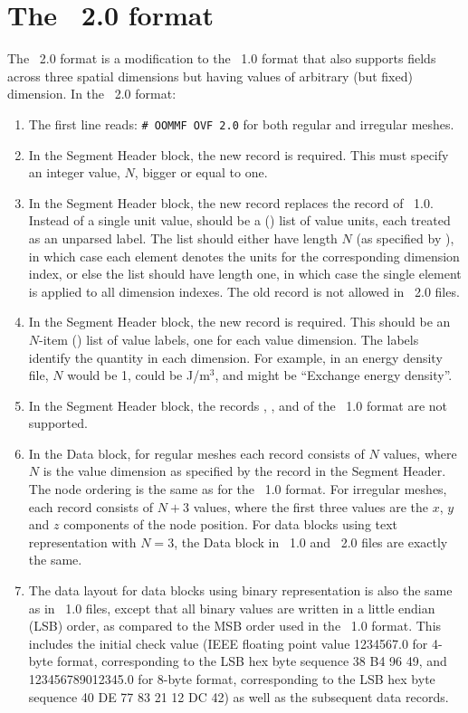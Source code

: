 \section{The \OVF\ 2.0 format}\label{sec:ovf20format}
The \OVF~2.0 format is a modification to the \OVF~1.0 format that also
supports fields across three spatial dimensions but having values of
arbitrary (but fixed) dimension.  In the \OVF~2.0 format:
\begin{enumerate}
\item The first line reads: \verb+# OOMMF OVF 2.0+ for both
regular and irregular meshes.
\item In the Segment Header block, the new record  is
required.  This must specify an integer value, $N$, bigger or equal to
one.
\item In the Segment Header block, the new  record
replaces the  record of \OVF~1.0.  Instead of a single
unit value,  should be a (\Tcl) list of value units, each
treated as an unparsed label.  The list should either have length $N$
(as specified by ), in which case each element denotes
the units for the corresponding dimension index, or else the list
should have length one, in which case the single element is applied to
all dimension indexes.  The old  record is not allowed
in \OVF~2.0 files.
\item In the Segment Header block, the new  record is
required.  This should be an $N$-item (\Tcl) list of value labels, one
for each value dimension.  The labels identify the quantity in each
dimension.  For example, in an energy density file, $N$ would be 1,
 could be J/m${}^3$, and  might be
``Exchange energy density''.
\item In the Segment Header block, the records
, ,  and
 of the \OVF~1.0 format are not supported.
\item In the Data block, for regular meshes each record consists of
$N$ values, where $N$ is the value dimension as specified by the
 record in the Segment Header.  The node ordering is
the same as for the \OVF~1.0 format.  For irregular meshes, each
record consists of $N+3$ values, where the first three values are the
$x$, $y$ and $z$ components of the node position.  For data blocks
using text representation with $N = 3$, the Data block in
\OVF~1.0 and \OVF~2.0 files are exactly the same.
\item The data layout for data blocks using binary representation is
also the same as in \OVF~1.0 files, except that all binary values are
written in a little endian (LSB) order, as compared to the MSB order
used in the \OVF~1.0 format.  This includes the initial check value
(IEEE floating point value 1234567.0 for 4-byte format, corresponding
to the LSB hex byte sequence 38 B4 96 49, and 123456789012345.0 for
8-byte format, corresponding to the LSB hex byte sequence 40 DE 77 83
21 12 DC 42) as well as the subsequent data records.
\end{enumerate}
